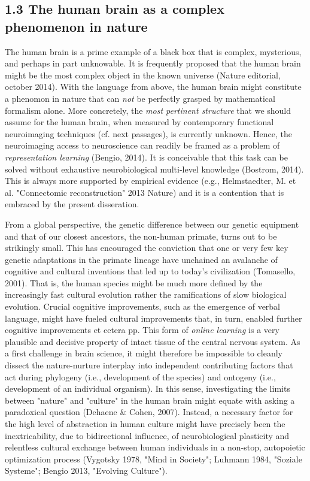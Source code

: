 \documentclass[authoryear,review,3p]{elsarticle}
\begin{document}
\subsection*{1.3 The human brain as a complex phenomenon in nature}
The human brain is a prime example of
a black box that is complex, mysterious, and perhaps in part unknowable.
It is frequently proposed that
the human brain might be the most complex object in the known universe
(Nature editorial, october 2014).
With the language from above,
the human brain might constitute a phenomon in nature that
can \textit{not} be perfectly grasped by mathematical formalism alone.
More concretely,
the \textit{most pertinent structure}
that we should assume for the human brain,
when measured by
contemporary functional neuroimaging techniques (cf. next passages),
is currently unknown.
Hence, the neuroimaging access to neuroscience can readily be framed as
a problem of \textit{representation learning} (Bengio, 2014).
It is conceivable
that this task can be solved without exhaustive
neurobiological multi-level knowledge (Bostrom, 2014).
This is always more supported by empirical evidence
(e.g., Helmstaedter, M. et al. "Connectomic reconstruction" 2013 Nature)
and
it is a contention that is embraced by the present disseration.


From a global perspective,
the genetic difference between our genetic equipment and that
of our closest ancestors, the non-human primate, turns out to be 
strikingly small.
This has encouraged the conviction that one or very few key genetic
adaptations in the primate lineage have unchained an avalanche
of cognitive and cultural inventions that led up to today's civilization
(Tomasello, 2001).
That is, the human species might be much more defined by the
increasingly fast cultural evolution rather the ramifications
of slow biological evolution.
Crucial cognitive improvements,
such as the emergence of verbal language, 
might have fueled cultural improvements that, in turn, enabled
further cognitive improvements et cetera pp.
This form of \textit{online learning} is a very plausible and decisive
property of intact tissue of the central nervous system.
%
As a first challenge in brain science,
it might therefore be impossible to cleanly dissect
the nature-nurture interplay into independent contributing factors that act
during
phylogeny (i.e., development of the species)
and
ontogeny (i.e., development of an individual organism).
%
In this sense,
investigating the limits between "nature" and "culture" in the human brain
might equate with asking a paradoxical question
(Dehaene \& Cohen, 2007).
%
Instead,
a necessary factor for the high level of abstraction in human culture
might have precisely been the inextricability, due to bidirectional influence, of
neurobiological plasticity and relentless cultural exchange
between human individuals
in a non-stop, autopoietic optimization process
(Vygotsky 1978, "Mind in Society"; Luhmann 1984, "Soziale Systeme";
Bengio 2013, "Evolving Culture").
\end{document}
